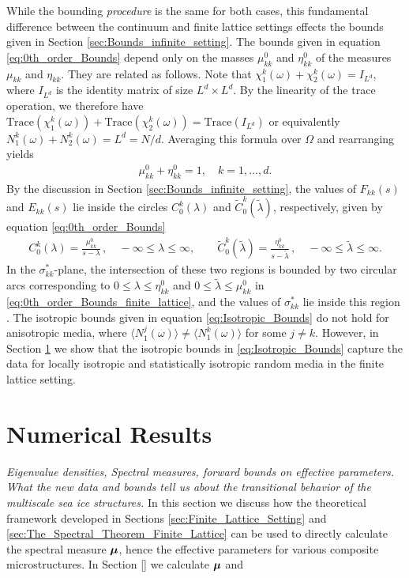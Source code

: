 \documentclass{cmslatex}
\newcommand\bmu{\mbox{\boldmath${\mu}$}}
\begin{document}
While the bounding \emph{procedure} is the same for both cases, this
fundamental difference between the continuum and finite lattice
settings effects the bounds given in Section
\eqref{sec:Bounds_infinite_setting}. The bounds given in equation
\eqref{eq:0th_order_Bounds} depend only on the masses $\mu_{kk}^0$ and
$\eta_{kk}^0$ of the measures $\mu_{kk}$ and $\eta_{kk}$. They are related as
follows. Note that $\chi_1^k(\omega)+\chi_2^k(\omega)=I_{L^d}$, where $I_{L^d}$ is the
identity matrix of size $L^d\times L^d$. By the linearity of the trace
operation, we therefore have
$\text{Trace}(\chi_1^k(\omega))+\text{Trace}(\chi_2^k(\omega))=\text{Trace}(I_{L^d})$   
or equivalently $N_1^k(\omega)+N_2^k(\omega)=L^d=N/d$. Averaging this formula
over $\Omega$ and rearranging yields
%
\begin{align*}
  \mu_{kk}^0+\eta_{kk}^0=1, \quad  k=1,\ldots,d.
\end{align*}
%
By the discussion in Section \ref{sec:Bounds_infinite_setting}, the
values of $F_{kk}(s)$ and $E_{kk}(s)$ lie inside the circles
$C^k_0(\lambda)$ and $\tilde{C}^k_0(\tilde{\lambda})$, respectively, given by
equation \eqref{eq:0th_order_Bounds}  
%
\begin{align}\label{eq:0th_order_Bounds_finite_lattice}
    C_0^k(\lambda)=\frac{\mu_{kk}^0}{s-\lambda}\,, \quad -\infty\leq\lambda\leq \infty, \qquad
    \tilde{C}^k_0(\tilde{\lambda})=\frac{\eta_{kk}^0}{s-\tilde{\lambda}}\,, \quad
    -\infty\leq\tilde{\lambda}\leq \infty. 
\end{align}
%  
In the $\sigma^*_{kk}$-plane, the intersection of these two regions is bounded by
two circular arcs corresponding to $0\leq\lambda\leq\eta_{kk}^0$ and $0\leq\tilde{\lambda}\leq\mu_{kk}^0$
in \eqref{eq:0th_order_Bounds_finite_lattice}, and the values of
$\sigma^*_{kk}$ lie inside this region \cite{Golden:1986:BCP}. The
isotropic bounds given in equation \eqref{eq:Isotropic_Bounds} do not
hold for anisotropic media, where $\langle N_1^j(\omega)\rangle\neq\langle N_1^k(\omega)\rangle$ for some
$j\neq k$. However, in Section \ref{sec:Numerical_Results} we show that
the isotropic bounds in \eqref{eq:Isotropic_Bounds} capture the data
for locally isotropic and statistically isotropic random media in the
finite lattice setting. 







\section{Numerical Results}\label{sec:Numerical_Results}
{\it Eigenvalue densities, Spectral measures, forward bounds on
  effective parameters. What the new data and bounds tell us about the
  transitional behavior of the multiscale sea ice structures.}
%
In this section we discuss how the theoretical framework developed in
Sections \ref{sec:Finite_Lattice_Setting} and
\ref{sec:The_Spectral_Theorem_Finite_Lattice} can be used to directly
calculate the spectral measure $\bmu$, hence the effective parameters
for various composite microstructures. In Section \ref{} we calculate
$\bmu$ and  
%
\end{document}
